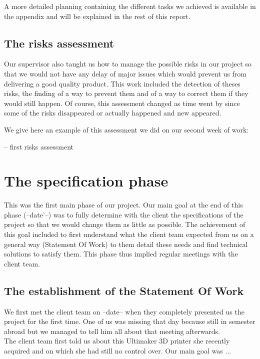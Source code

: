 \documentclass{report}
\begin{document}
A more detailed planning containing the different tasks we achieved is available in the appendix and will be explained in the rest of this report.

\section{The risks assessment}

Our supervisor also taught us how to manage the possible risks in our project so that we would not have any delay of major issues which would prevent us from delivering a good quality product. This work included the detection of theses risks, the finding of a way to prevent them and of a way to correct them if they would still happen. Of course, this assessment changed as time went by since some of the risks disappeared or actually happened and new appeared.

We give here an example of this assessment we did on our second week of work:

\bigskip
-- first risks assessment
\bigskip

\chapter{The specification phase}

This was the first main phase of our project. Our main goal at the end of this phase (--date'--)  was to fully determine with the client the specifications of the project so that we would change them as little as possible. The achievement  of this goal included to first understand what the client team expected from us on a general way (Statement Of Work) to them detail these needs and find technical solutions to satisfy them. This phase thus implied regular meetings with the client team.

\section{The establishment of the Statement Of Work}

We first met the client team on --date-- when they completely presented us the project for the first time. One of us was missing that day because still in semester abroad but we managed to tell him all about that meeting afterwards. \\

The client team first told us about this Ultimaker 3D printer she recently acquired and on which she had still no control over. Our main goal was ...
\end{document}
